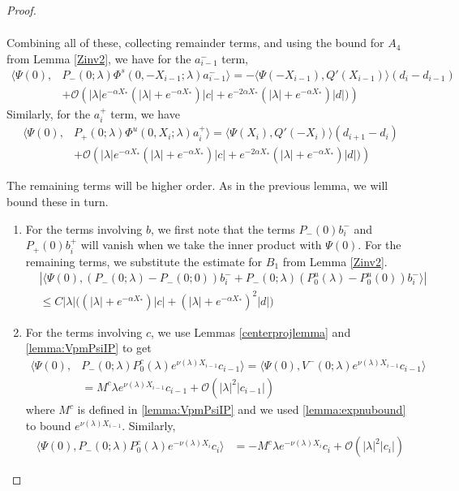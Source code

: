 \documentclass[thesis.tex]{subfiles}
\begin{document}
\begin{lemma}
\begin{proof}
\begin{enumerate}
\begin{align*}
\end{align*}
Combining all of these, collecting remainder terms, and using the bound for $A_4$ from Lemma \ref{Zinv2}, we have for the $a_{i-1}^-$ term,
\begin{align*}
\langle \Psi(0), &P_-(0; \lambda) \Phi^s(0, -X_{i-1}; \lambda) a_{i-1}^- \rangle = -\langle \Psi(-X_{i-1}), Q'(X_{i-1}) \rangle (d_i - d_{i-1} ) \\
&+ \mathcal{O} \left( |\lambda|e^{-\alpha X_*}(|\lambda| + e^{-\alpha X_*})|c| + e^{-2 \alpha X_*} (|\lambda| + e^{-\alpha X_*}) |d| ) \right)
\end{align*}
Similarly, for the $a_i^+$ term, we have
\begin{align*}
\langle \Psi(0), &P_+(0; \lambda) \Phi^u(0, X_i; \lambda) a_i^+ \rangle = \langle \Psi(X_i), Q'(-X_i) \rangle (d_{i+1} - d_i ) \\
&+ \mathcal{O} \left( |\lambda|e^{-\alpha X_*}(|\lambda| + e^{-\alpha X_*})|c| + e^{-2 \alpha X_*} (|\lambda| + e^{-\alpha X_*}) |d| ) \right)
\end{align*}
\end{enumerate}

The remaining terms will be higher order. As in the previous lemma, we will bound these in turn.

\begin{enumerate}

\item For the terms involving $b$, we first note that the terms $P_-(0) b_i^-$ and $P_+(0)b_i^+$ will vanish when we take the inner product with $\Psi(0)$. For the remaining terms, we substitute the estimate for $B_1$ from Lemma \ref{Zinv2}.
\begin{align*}
&|\langle \Psi(0), (P_-(0; \lambda) - P_-(0; 0))b_i^- + P_-(0; \lambda)(P_0^u(\lambda) - P_0^u(0))b_i^- \rangle | \\
&\leq C |\lambda| \Big( (|\lambda| + e^{-\alpha X_*})|c| + (|\lambda| + e^{-\alpha X_*})^2 |d| \Big)
\end{align*}

\item For the terms involving $c$, we use Lemmas \ref{centerprojlemma} and \ref{lemma:VpmPsiIP} to get
\begin{align*}
\langle \Psi(0), &P_-(0; \lambda) P_0^c(\lambda) e^{\nu(\lambda) X_{i-1}} c_{i-1} \rangle = \langle \Psi(0), V^-(0; \lambda) e^{\nu(\lambda) X_{i-1}} c_{i-1} \rangle  \\
&= M^c \lambda e^{\nu(\lambda) X_{i-1}} c_{i-1} + \mathcal{O}(|\lambda|^2 |c_{i-1}|)
\end{align*}
where $M^c$ is defined in \cref{lemma:VpmPsiIP} and we used \cref{lemma:expnubound} to bound $e^{\nu(\lambda) X_{i-1}}$. Similarly, 
\begin{align*}
\langle \Psi(0), P_-(0; \lambda) P_0^c(\lambda) e^{-\nu(\lambda) X_i} c_i \rangle 
&= -M^c \lambda e^{-\nu(\lambda) X_i} c_i + \mathcal{O}(|\lambda|^2|c_i|)
\end{align*}


\end{enumerate}
\end{proof}
\end{lemma}
\end{document}
